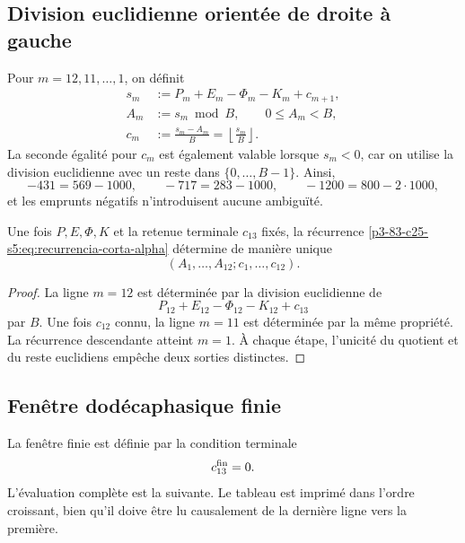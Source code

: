 \subsection{Division euclidienne orientée de droite à gauche}

Pour \(m=12,11,\ldots,1\), on définit
\begin{equation}
\begin{aligned}
 s_m&:=P_m+E_m-\Phi_m-K_m+c_{m+1},\\
 A_m&:=s_m\bmod B,
       \qquad 0\leq A_m<B,\\
 c_m&:=\frac{s_m-A_m}{B}
      =\left\lfloor\frac{s_m}{B}\right\rfloor .
\end{aligned}
\label{p3-83-c25-s5:eq:recurrencia-corta-alpha}
\end{equation}
La seconde égalité pour \(c_m\) est également valable lorsque \(s_m<0\),
car on utilise la division euclidienne avec un reste dans
\(\{0,\ldots,B-1\}\). Ainsi,
\[
 -431=569-1000,
 \qquad
 -717=283-1000,
 \qquad
 -1200=800-2\cdot1000,
\]
et les emprunts négatifs n’introduisent aucune ambiguïté.

\begin{theorem}
\label{p3-83-c25-s5:thm:unicidad-acarreo-orientado-alpha}
Une fois \(P,E,\Phi,K\) et la retenue terminale \(c_{13}\) fixés, la récurrence
\eqref{p3-83-c25-s5:eq:recurrencia-corta-alpha} détermine de manière unique
\[
 (A_1,\ldots,A_{12};c_1,\ldots,c_{12}).
\]
\end{theorem}

\begin{proof}
La ligne \(m=12\) est déterminée par la division euclidienne de
\[
 P_{12}+E_{12}-\Phi_{12}-K_{12}+c_{13}
\]
par \(B\). Une fois \(c_{12}\) connu, la ligne \(m=11\) est déterminée par
la même propriété. La récurrence descendante atteint \(m=1\). À chaque
étape, l’unicité du quotient et du reste euclidiens empêche deux sorties
distinctes.
\end{proof}

\subsection{Fenêtre dodécaphasique finie}

La fenêtre finie est définie par la condition terminale
\[
 c_{13}^{\rm fin}=0.
\]
L’évaluation complète est la suivante. Le tableau est imprimé dans l’ordre
croissant, bien qu’il doive être lu causalement de la dernière ligne vers la
première.

